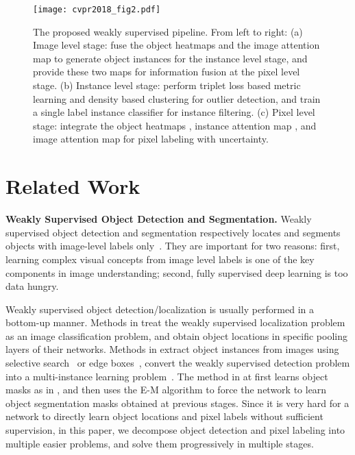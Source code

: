 \documentclass[10pt,twocolumn,letterpaper]{article}
\begin{document}
\begin{figure*}[ht]
  \centering
  \texttt{[image: cvpr2018\_fig2.pdf]}
  \caption{The proposed weakly supervised pipeline. From left to right: (a) Image level stage: fuse the object heatmaps  and the image attention map  to generate object instances  for the instance level stage, and provide these two maps for information fusion at the pixel level stage. (b) Instance level stage: perform triplet loss based metric learning and density based clustering for outlier detection, and train a single label instance classifier  for instance filtering. (c) Pixel level stage: integrate the object heatmaps , instance attention map , and image attention map  for pixel labeling with uncertainty.
}
  \label{Fig:WSCL}
\end{figure*}

\section{Related Work}
\noindent\textbf{Weakly Supervised Object Detection and Segmentation.} Weakly supervised object detection and segmentation respectively locates and segments objects with image-level labels only~\cite{oquab2015object,diba2016weakly}.
They are important for two reasons: first, learning complex visual concepts from image level labels is one of the key components in image understanding; second, fully supervised deep learning is too data hungry.

Weakly supervised object detection/localization is usually performed in a bottom-up manner. Methods in \cite{oquab2015object,durand2016weldon,durand2017wildcat} treat the weakly supervised localization problem as an image classification problem, and obtain object locations in specific pooling layers of their networks. Methods in \cite{bilen2016weakly,tang2017multiple} extract object instances from images using selective search~\cite{uijlings2013selective} or edge boxes~\cite{zitnick2014edge}, convert the weakly supervised detection problem into a multi-instance learning problem~\cite{dietterich1997solving}. The method in \cite{dietterich1997solving} at first learns object masks as in \cite{durand2016weldon,durand2017wildcat}, and then uses the E-M algorithm to force the network to learn object segmentation masks obtained at previous stages. Since it is very hard for a network to directly learn object locations and pixel labels without sufficient supervision, in this paper, we decompose object detection and pixel labeling into multiple easier problems, and solve them progressively in multiple stages.
\vspace{-0mm}
\end{document}
